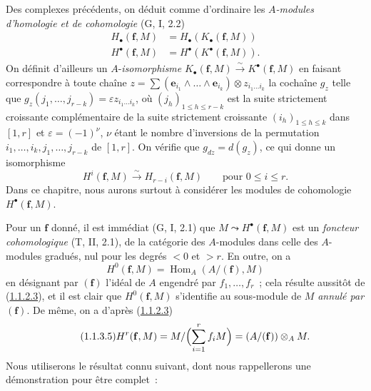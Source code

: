 \begin{env}[1.1.3]
\label{III.1.1.3-fr}
Des complexes précédents, on déduit comme d'ordinaire les \emph{$A$-modules
d'homologie et de cohomologie} (G, I, 2.2)
\begin{align}
\label{III.1.1.3.1-fr}
\tag{1.1.3.1}
H_\bullet(\mathbf f,M)&=H_\bullet(K_\bullet(\mathbf f,M))\\
\label{III.1.1.3.2-fr}
\tag{1.1.3.2}
H^\bullet(\mathbf f,M)&=H^\bullet(K^\bullet(\mathbf f,M)).
\end{align}
On définit d'ailleurs un $A$-\emph{isomorphisme}
$K_\bullet(\mathbf f,M)\xrightarrow{\sim}K^\bullet(\mathbf f,M)$ en faisant
correspondre à toute chaîne
$z=\sum(\mathbf e_{i_1}\wedge\ldots\wedge\mathbf e_{i_k})\otimes
z_{i_1\ldots i_k}$ la cochaîne $g_z$ telle que
$g_z(j_1,\ldots,j_{r-k})=\varepsilon z_{i_1\ldots i_k}$, où
$(j_h)_{1\leq h\leq r-k}$ est la suite strictement croissante complémentaire
de la suite strictement croissante $(i_h)_{1\leq h\leq k}$ dans $[1,r]$ et
$\varepsilon=(-1)^\nu$, $\nu$ étant le nombre d'inversions de la permutation
$i_1,\ldots,i_k,j_1,\ldots,j_{r-k}$ de $[1,r]$. On vérifie que
$g_{dz}=d(g_z)$, ce qui donne un isomorphisme
\begin{equation}
\label{III.1.1.3.3-fr}
\tag{1.1.3.3}
H^i(\mathbf f,M)\xrightarrow{\sim}H_{r-i}(\mathbf f,M)
\qquad\text{pour }0\leq i\leq r.
\end{equation}
Dans ce chapitre, nous aurons surtout à considérer les modules de cohomologie
$H^\bullet(\mathbf f,M)$.

Pour un $\mathbf f$ donné, il est immédiat (G, I, 2.1) que
$M\leadsto H^\bullet(\mathbf f,M)$ est un \emph{foncteur cohomologique}
(T, II, 2.1), de la catégorie des $A$-modules dans celle des $A$-modules
gradués, nul pour les degrés $<0$ et $>r$. En outre, on a
\begin{equation}
\label{III.1.1.3.4-fr}
\tag{1.1.3.4}
H^0(\mathbf f,M)=\operatorname{Hom}_A(A/(\mathbf f),M)
\end{equation}
en désignant par $(\mathbf f)$ l'idéal de $A$ engendré par
$f_1,\ldots,f_r$~; cela résulte aussitôt de
(\hyperref[III.1.1.2.3-fr]{1.1.2.3}), et il est clair que
$H^0(\mathbf f,M)$ s'identifie au sous-module de $M$ \emph{annulé par
$(\mathbf f)$}. De même, on a d'après
(\hyperref[III.1.1.2.3-fr]{1.1.2.3})
\begin{equation}
\label{III.1.1.3.5-fr}
\tag{1.1.3.5}
H^r(\mathbf f,M)=M/\Bigl(\sum_{i=1}^r f_iM\Bigr)
=(A/(\mathbf f))\otimes_A M.
\end{equation}
Nous utiliserons le résultat connu suivant, dont nous rappellerons une
démonstration pour être complet~:
\end{env}

